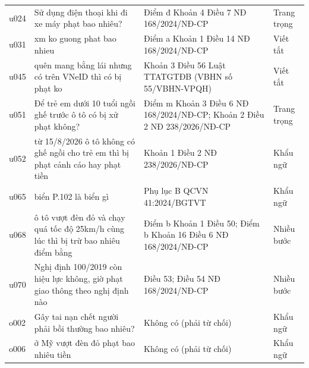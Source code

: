 \begin{longtable}{@{}l >{\raggedright\arraybackslash}p{5.5cm} >{\raggedright\arraybackslash}p{6.2cm} >{\raggedright\arraybackslash}p{1.9cm}@{}}
u024 & Sử dụng điện thoại khi đi xe máy phạt bao nhiêu? & Điểm đ Khoản 4 Điều 7 NĐ 168/2024/NĐ-CP & Trang trọng \\
u031 & xm ko guong phat bao nhieu & Điểm a Khoản 1 Điều 14 NĐ 168/2024/NĐ-CP & Viết tắt \\
u045 & quên mang bằng lái nhưng có trên VNeID thì có bị phạt ko & Khoản 3 Điều 56 Luật TTATGTĐB (VBHN số 55/VBHN-VPQH) & Viết tắt \\
u051 & Để trẻ em dưới 10 tuổi ngồi ghế trước ô tô có bị xử phạt không? & Điểm m Khoản 3 Điều 6 NĐ 168/2024/NĐ-CP; Khoản 2 Điều 2 NĐ 238/2026/NĐ-CP & Trang trọng \\
u052 & từ 15/8/2026 ô tô không có ghế ngồi cho trẻ em thì bị phạt cảnh cáo hay phạt tiền & Khoản 1 Điều 2 NĐ 238/2026/NĐ-CP & Khẩu ngữ \\
u065 & biển P.102 là biển gì & Phụ lục B QCVN 41:2024/BGTVT & Khẩu ngữ \\
u068 & ô tô vượt đèn đỏ và chạy quá tốc độ 25km/h cùng lúc thì bị trừ bao nhiêu điểm bằng & Điểm b Khoản 1 Điều 50; Điểm b Khoản 16 Điều 6 NĐ 168/2024/NĐ-CP & Nhiều bước \\
u070 & Nghị định 100/2019 còn hiệu lực không, giờ phạt giao thông theo nghị định nào & Điều 53; Điều 54 NĐ 168/2024/NĐ-CP & Nhiều bước \\
o002 & Gây tai nạn chết người phải bồi thường bao nhiêu? & Không có (phải từ chối) & Khẩu ngữ \\
o006 & ở Mỹ vượt đèn đỏ phạt bao nhiêu tiền & Không có (phải từ chối) & Khẩu ngữ \\
\end{longtable}
\endgroup
\fussy
